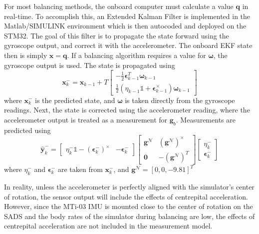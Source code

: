 For most balancing methods, the onboard computer must calculate a value $\bm{q}$ in real-time. To accomplish this, an Extended Kalman Filter is implemented in the Matlab/SIMULINK environment which is then autocoded and deployed on the STM32. The goal of this filter is to propagate the state forward using the gyroscope output, and correct it with the accelerometer. The onboard EKF state then is simply $\bm{x} = \bm{q}$. If a balancing algorithm requires a value for $\bm{\omega}$, the gyroscope output is used. The state is propagated using
\begin{equation}\label{equation:EKF_process}
    \bm{x}_k^-=\bm{x}_{k-1} + T\begin{bmatrix}
    
    -\frac{1}{2}\bm{\epsilon}_{k-1}^T\bm{\omega}_{k-1} \\
    \frac{1}{2}(\eta_{k-1}\mathbb{1} +
    \bm{\epsilon}_{k-1}^{\times})\bm{\omega}_{k-1}
\end{bmatrix}
\end{equation}
where $\bm{x}_k^-$ is the predicted state, and $\bm{\omega}$ is taken directly from the gyroscope readings. Next, the state is corrected using the accelerometer reading, where the accelerometer output is treated as a measurement for $\bm{g}_b$. Measurements are predicted using 
\begin{equation}\label{equation:EKF_meas}
    \hat{\bm{y}}_k^-=
    \begin{bmatrix}    
    \eta_k^-\mathbb{1}-(\bm{\epsilon}_k^-)^{\times} & -\bm{\epsilon}_k^-
    \end{bmatrix}
    \begin{bmatrix}    
    \bm{g}^\mathcal{N} & (\bm{g}^\mathcal{N})^{\times} \\
    \bm{0} & - (\bm{g}^\mathcal{N})^T
    \end{bmatrix}
    \begin{bmatrix}    
    \eta_k^- \\
    \bm{\epsilon}_k^-
    \end{bmatrix}
\end{equation}
where $\eta_k^-$ and $\bm{\epsilon}_k^-$ are taken from $\bm{x}_k^-$, and $\bm{g}^\mathcal{N}=[0, 0,-9.81]^T$

In reality, unless the accelerometer is perfectly aligned with the simulator's center of rotation, the sensor output will include the effects of centrepital acceleration. However, since the MTi-03 IMU is mounted close to the center of rotation on the SADS and the body rates of the simulator during balancing are low, the effects of centrepital acceleration are not included in the measurement model.

